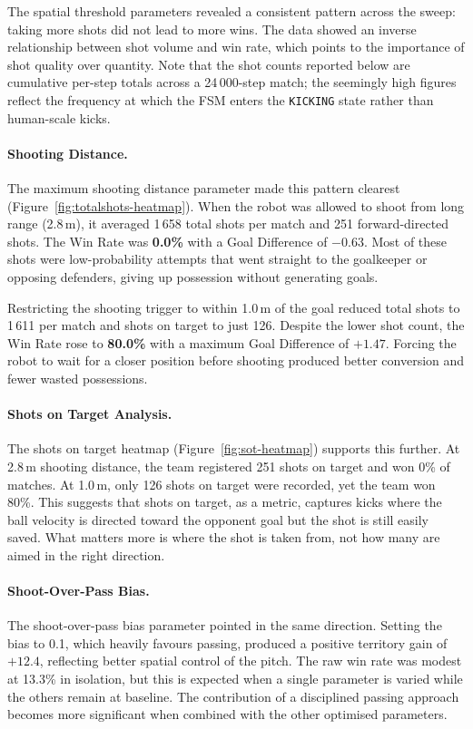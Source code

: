 \documentclass[12pt, a4paper]{report}
\begin{document}
The spatial threshold parameters revealed a consistent pattern across the
sweep: taking more shots did not lead to more wins. The data showed an
inverse relationship between shot volume and win rate, which points to the
importance of shot quality over quantity.
Note that the shot counts reported below are cumulative per-step totals
across a 24\,000-step match; the seemingly high figures reflect the
frequency at which the FSM enters the \texttt{KICKING} state rather than
human-scale kicks.

\paragraph{Shooting Distance.}
The maximum shooting distance parameter made this pattern clearest
(Figure~\ref{fig:totalshots-heatmap}).
When the robot was allowed to shoot from long range (2.8\,m), it averaged
1\,658 total shots per match and 251 forward-directed shots.
The Win Rate was \textbf{0.0\%} with a Goal Difference of $-0.63$.
Most of these shots were low-probability attempts that went straight to the
goalkeeper or opposing defenders, giving up possession without generating
goals.

Restricting the shooting trigger to within 1.0\,m of the goal reduced total
shots to 1\,611 per match and shots on target to just 126.
Despite the lower shot count, the Win Rate rose to \textbf{80.0\%} with a
maximum Goal Difference of $+1.47$.
Forcing the robot to wait for a closer position before shooting produced
better conversion and fewer wasted possessions.

\paragraph{Shots on Target Analysis.}
The shots on target heatmap (Figure~\ref{fig:sot-heatmap}) supports this
further.
At 2.8\,m shooting distance, the team registered 251 shots on target and
won 0\% of matches.
At 1.0\,m, only 126 shots on target were recorded, yet the team won 80\%.
This suggests that shots on target, as a metric, captures kicks where the
ball velocity is directed toward the opponent goal but the shot is still
easily saved.
What matters more is where the shot is taken from, not how many are aimed
in the right direction.

\paragraph{Shoot-Over-Pass Bias.}
The shoot-over-pass bias parameter pointed in the same direction.
Setting the bias to 0.1, which heavily favours passing, produced a positive
territory gain of $+12.4$, reflecting better spatial control of the pitch.
The raw win rate was modest at 13.3\% in isolation, but this is expected
when a single parameter is varied while the others remain at baseline.
The contribution of a disciplined passing approach becomes more significant
when combined with the other optimised parameters.
\end{document}
